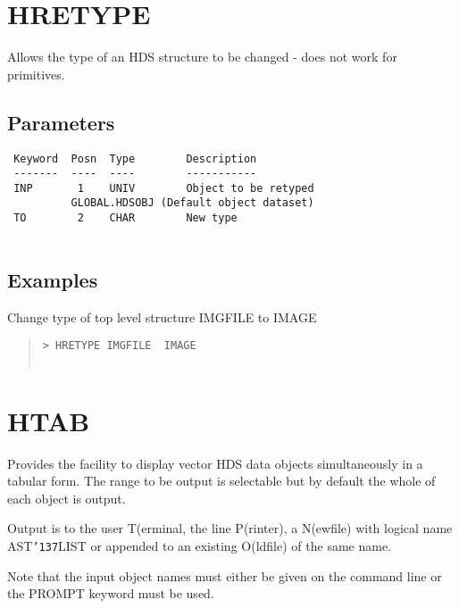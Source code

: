 \documentclass{book}
\renewcommand{\_}{{\tt\char'137}}     %
\begin{document}
\section{HRETYPE}
Allows the type of an HDS structure to be changed - does not work
for primitives.
 
\subsection{Parameters}
\begin{verbatim}
 Keyword  Posn  Type        Description
 -------  ----  ----        -----------
 INP       1    UNIV        Object to be retyped
          GLOBAL.HDSOBJ (Default object dataset)
 TO        2    CHAR        New type
 
\end{verbatim}\subsection{Examples}
Change type of top level structure IMGFILE to IMAGE
\begin{quote}\begin{verbatim}
> HRETYPE IMGFILE  IMAGE
 
\end{verbatim}\end{quote}
\section{HTAB}
Provides the facility to display vector HDS data objects
simultaneously in a tabular form. The range to be output is
selectable but by default the whole of each object is output.
 
Output is to the user T(erminal, the line P(rinter), a N(ewfile)
with logical name AST\_LIST or appended to an existing O(ldfile)
of the same name.
 
Note that the input object names must either be given on the
command line or the PROMPT keyword must be used.
 
\end{document}
